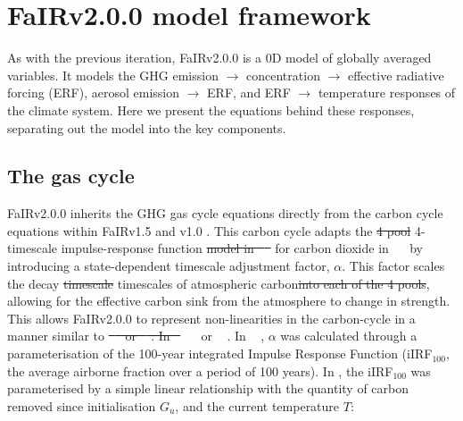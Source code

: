 \documentclass[gmd, manuscript]{copernicus}
\providecommand{\DIFadd}[1]{{\protect\color{blue}#1}} %
\providecommand{\DIFdel}[1]{{\protect\color{red}\sout{#1}}}                      %
\providecommand{\DIFaddbegin}{} %
\providecommand{\DIFaddend}{} %
\providecommand{\DIFdelbegin}{} %
\providecommand{\DIFdelend}{} %
\begin{document}
\section{FaIRv2.0\DIFaddbegin \DIFadd{.0 }\DIFaddend model framework} \label{framework}
As with the previous iteration, FaIRv2.0\DIFaddbegin \DIFadd{.0 }\DIFaddend is a 0D model of globally averaged variables. It models the GHG emission $\rightarrow$ concentration $\rightarrow$ effective radiative forcing (ERF), aerosol emission $\rightarrow$ ERF, and ERF $\rightarrow$ temperature responses of the climate system. Here we present the equations behind these responses, separating out the model into the key components. 
\subsection{The gas cycle} \label{gas_cycle}
FaIRv2.0\DIFaddbegin \DIFadd{.0 }\DIFaddend inherits the GHG gas cycle equations directly from the carbon cycle equations within FaIRv1.5 \citep{Smith2018} and v1.0 \citep{Millar2016}. This carbon cycle adapts the \DIFdelbegin \DIFdel{4 pool }\DIFdelend \DIFaddbegin \DIFadd{4-timescale }\DIFaddend impulse-response function \DIFdelbegin \DIFdel{model in \mbox{%
\cite{Joos2013} }\hspace{0pt}%
}\DIFdelend \DIFaddbegin \DIFadd{for carbon dioxide in \mbox{%
\citet{Joos2013} }\hspace{0pt}%
}\DIFaddend by introducing a state-dependent timescale adjustment factor, $\alpha$. This factor scales the decay \DIFdelbegin \DIFdel{timescale }\DIFdelend \DIFaddbegin \DIFadd{timescales }\DIFaddend of atmospheric carbon\DIFdelbegin \DIFdel{into each of the 4 pools}\DIFdelend , allowing for the effective carbon sink from the atmosphere to change in strength. This allows FaIRv2.0\DIFaddbegin \DIFadd{.0 }\DIFaddend to represent non-linearities in the carbon-cycle in a manner similar to \DIFdelbegin \DIFdel{\mbox{%
\cite{JOOS1996} }\hspace{0pt}%
or \mbox{%
\cite{Hooss2001}}\hspace{0pt}%
. In \mbox{%
\cite{Millar2016}}\hspace{0pt}%
}\DIFdelend \DIFaddbegin \DIFadd{\mbox{%
\citet{JOOS1996} }\hspace{0pt}%
or \mbox{%
\citet{Hooss2001}}\hspace{0pt}%
. In \mbox{%
\citet{Millar2016}}\hspace{0pt}%
}\DIFaddend , $\alpha$ was calculated through a parameterisation of the 100-year integrated Impulse Response Function (iIRF$_{100}$, the average airborne fraction over a period of 100 years). In \citet{Millar2016}, the iIRF$_{100}$ was parameterised by a simple linear relationship with the quantity of carbon removed since initialisation $G_u$, and the current temperature $T$:
\end{document}
